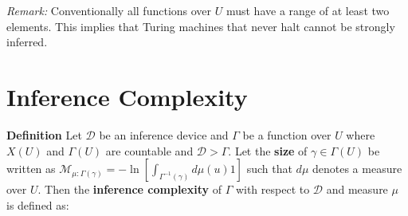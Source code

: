 \documentclass[11pt]{article}
\newcommand{\N}{\mathbb{N}}
\begin{document}
\textit{Remark:} Conventionally all functions over $ U $ must have a range of at least two elements. This implies that Turing machines that never halt cannot be strongly inferred.






%
%       




\section{Inference Complexity}

\textbf{Definition} \quad Let $ \mathcal{D} $ be an inference device and $ \Gamma $ be a function over $ U $ where $ X(U) $ and $ \Gamma(U) $ are countable and $ \mathcal{D} > \Gamma $. Let the \textbf{size} of $\gamma \in \Gamma(U) $ be written as $ \mathcal{M}_{\mu:\Gamma(\gamma)} = -\ln[\int_{\Gamma^{-1}(\gamma)} d\mu(u) 1] $ such that $ d\mu $ denotes a measure over $ U $. Then the \textbf{inference complexity} of $ \Gamma $ with respect to $ \mathcal{D} $ and measure $ \mu $ is defined as: 
\end{document}
